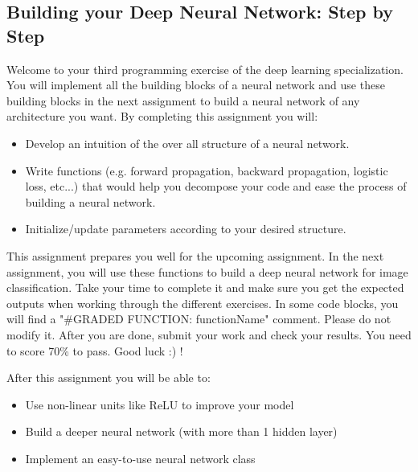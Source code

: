 \subsection{Building your Deep Neural Network: Step by Step}

Welcome to your third programming exercise of the deep learning specialization. You will implement all the building blocks of a neural network and use these building blocks in the next assignment to build a neural network of any architecture you want. By completing this assignment you will:
\begin{itemize}
\item Develop an intuition of the over all structure of a neural network.

\item Write functions (e.g. forward propagation, backward propagation, logistic loss, etc...) that would help you decompose your code and ease the process of building a neural network.

\item Initialize/update parameters according to your desired structure.
\end{itemize}

This assignment prepares you well for the upcoming assignment. In the next assignment, you will use these functions to build a deep neural network for image classification. Take your time to complete it and make sure you get the expected outputs when working through the different exercises. In some code blocks, you will find a "\#GRADED FUNCTION: functionName" comment. Please do not modify it. After you are done, submit your work and check your results. You need to score 70\% to pass. Good luck :) !


After this assignment you will be able to:
\begin{itemize}
\item Use non-linear units like ReLU to improve your model
\item Build a deeper neural network (with more than 1 hidden layer)
\item Implement an easy-to-use neural network class
\end{itemize}


